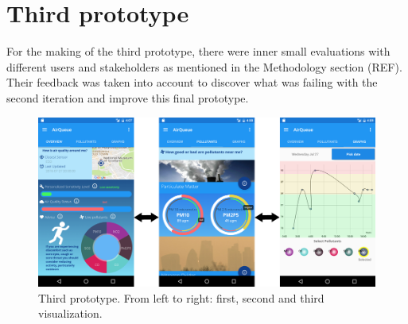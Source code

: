 \section{Third prototype}
For the making of the third prototype, there were inner small evaluations with different users and stakeholders as mentioned in the Methodology section (REF). Their feedback was taken into account to discover what was failing with the second iteration and improve this final prototype. 

\begin{figure}[H]
\begin{adjustbox}{width=1.2\textwidth,center=\textwidth}
  \centering
  \includegraphics[scale=1]{images/thirdPrototype.png}
\end{adjustbox}
  \caption[Second prototype]{Third prototype. From left to right: first, second and third visualization.}
  \label{fig:third_prototype}
\end{figure}

